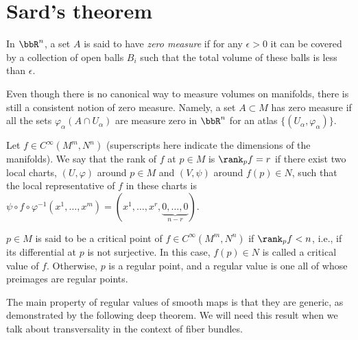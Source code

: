 \section{Sard's theorem}

In $\bbR^n$, a set $A$ is said to have\emph{ zero measure} if for any $\epsilon>0$ it can be covered by a collection of open balls $B_i$ such that the total volume of these balls is less than $\epsilon$.

\begin{defn}
    Even though there is no canonical way to measure volumes on manifolds, there is still a consistent notion of zero measure. Namely, a set $A\subset M$ has zero measure if all the sets $\varphi_\alpha(A\cap U_\alpha)$ are measure zero in $\bbR^n$ for an atlas $\{(U_\alpha,\varphi_\alpha)\}$.
\end{defn}

\begin{defn}\label{def.rank}
    Let $f\in C^\infty (M^m,N^n)$ (superscripts here indicate the dimensions of the manifolds). We say that the rank of $f$ at $p\in M$ is $\rank_p f=r$ if there exist two local charts, $(U,\varphi)$ around $p \in M$ and $(V,\psi)$ around $f(p)\in N$, such that the local representative of $f$ in these charts is $\psi\circ f\circ\varphi^{-1}(x^1,\ldots,x^m)=(x^1,\ldots,x^r,\underbrace{0,\ldots,0}_{n-r})$.
\end{defn}

\begin{defn}
    $p\in M$ is said to be a critical point of $f\in C^\infty(M^m,N^n)$ if $\rank_p f<n$, i.e., if its differential at $p$ is not surjective. In this case, $f(p)\in N$ is called a critical value of $f$. Otherwise, $p$ is a regular point, and a regular value is one all of whose preimages are regular points.
\end{defn}

The main property of regular values of smooth maps is that they are generic, as demonstrated by the following deep theorem. We will need this result when we talk about transversality in the context of fiber bundles.

